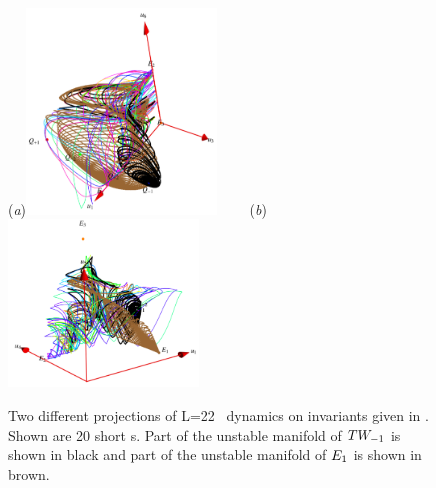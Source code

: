 \begin{figure}[t]
\begin{center}
  (\textit{a})\includegraphics[width=0.45\textwidth]{../figs/ksSO2inv134}
~~~~(\textit{b})\includegraphics[width=0.45\textwidth]{../figs/ksSO2inv145}
\end{center}
\caption[\KS\  reduced \statesp\ projection II]
{Two different projections of L=22 \KS\ dynamics on invariants
given in . Shown are 20
short \rpo s. Part of the unstable manifold of
$TW_{-1}$ is shown in black and part of the unstable manifold of $E_{1}$ is
shown in brown.}
\label{fig:SO2inv}
\end{figure}
